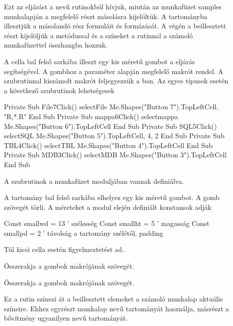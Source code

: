 \begin{description}
\item[] Ezt az eljárást a
   nevű rutinokból hívjuk, miután 
  az  munkafüzet samples munkalapján a megfelelő részt
  másolásra kijelöltük. 
  A  tartományba illesztjük a másolandó rész formuláit és
  formázását. A végén a beillesztett részt kijelöljük a 
  metódussal és a színeket a  rutinnal a 
  számoló munkafüzettel összhangba hozzuk. 

\item[]
A  cella bal felső sarkába illeszt egy kis méretű gombot a
 eljárás segítségével. A gombhoz a 
paraméter alapján megfelelő makrót rendel. A  
szubrutinnal kiszámolt makrót feljegyezzük a ban. Az egyes típusok esetén a következő szubrutinok lehetségesek
\begin{VBAframe}
Private Sub File7Click()
  selectFile Me.Shapes("Button 7").TopLeftCell, "R,*.R"
End Sub
Private Sub mappa6Click()
  selectmappa Me.Shapes("Button 6").TopLeftCell
End Sub
Private Sub SQL5Click()
  selectSQL Me.Shapes("Button 5").TopLeftCell, 4, 2
End Sub
Private Sub TBL4Click()
  selectTBL Me.Shapes("Button 4").TopLeftCell
End Sub
Private Sub MDB3Click()
  selectMDB Me.Shapes("Button 3").TopLeftCell
End Sub
\end{VBAframe}
A  szubrutinok a  munkafüzet
 moduljában vannak definiálva. 
\item[] A  tartomány bal felső sarkába
elhelyez egy kis méretű gombot. A gomb szövegét törli. A méreteket a
modul elején definiált konstansok adják 
\begin{VBAframe} 
Const smallwd = 13 ' szélesség
Const smallht = 5  ' magasság
Const smallpd = 2  ' távolság a tartomány szélétől, padding
\end{VBAframe}
Túl kicsi cella esetén figyelmeztetést ad.
\item[] Összerakja a  gombok makrójának szövegét.
\item[] Összerakja a  gombok makrójának szövegét.
\item[] Ez a rutin színezi
  át a beillesztett elemeket a számoló munkalap aktuális
  színeire. Ehhez egyrészt  munkalap  nevű 
  tartományát használja, másrészt a  bővítmény ugyanilyen
  nevű tartományát. 


\end{description}
